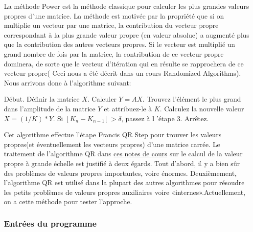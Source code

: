 
\vspace*{.5cm}

 La méthode Power est la méthode classique pour calculer les plus grandes valeurs propres d'une matrice. La méthode est motivée par la propriété que si on multiplie un vecteur par une matrice, la contribution du vecteur propre correspondant à la plus grande valeur propre (en valeur absolue) a augmenté plus que la contribution des autres vecteurs propres. Si le vecteur est multiplié un grand nombre de fois par la matrice, la contribution de ce vecteur propre dominera, de sorte que le vecteur d'itération qui en résulte se rapprochera de ce vecteur propre( Ceci nous a été décrit dans un cours Randomized Algorithms\cite{M.goodrich}). Nous arrivons donc à l'algorithme suivant:
 
 
  \begin{itemize}
  Début.
  Définir la matrice $X$.
  Calculer $Y = AX$.
  Trouvez l'élément le plus grand dans l'amplitude de la matrice $Y$ et attribuez-le à $K$.
  Calculez la nouvelle valeur $X = (1 / K) * Y$.
  Si $[K_{n} - K_{n-1}]> \delta$, passez à l 'étape 3.
  Arrêtez.
 \end{itemize}
 
 
 \vspace*{.5cm}
 
 Cet algorithme effectue l’étape Francis QR Step pour trouver les valeurs propres(et éventuellement les vecteurs propres) d’une matrice carrée.
Le traitement de l'algorithme QR dans  \href{http://people.inf.ethz.ch/arbenz/ewp/Lnotes/2010/chapter3.pdf}{ces notes de cours} sur le calcul de la valeur propre à grande échelle est justifié à deux égards. Tout d'abord, il y a bien sûr des problèmes de valeurs propres importantes, voire énormes. Deuxièmement, l'algorithme QR est utilisé dans la plupart des autres algorithmes pour résoudre les petits problèmes de valeurs propres auxiliaires voire «internes».Actuellement, on a cette méthode pour tester l’approche. 

\subsubsection{Entrées du programme}


